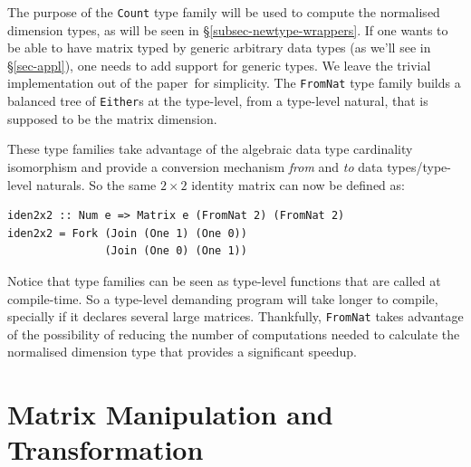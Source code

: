 \documentclass[sigplan,screen]{acmart}
\newcommand{\hs}{\texttt}
\def\doc{paper}
\begin{document}
The purpose of the \hs{Count} type family will be used to compute the normalised dimension types, as will be seen in \S\ref{subsec-newtype-wrappers}. If one wants to be able to have matrix typed by generic arbitrary data types (as we'll see in \S\ref{sec-appl}), one needs to add support for generic types. We leave the trivial implementation out of the \doc\ for simplicity. The \hs{FromNat} type family builds a balanced tree of \hs{Either}s at the type-level, from a type-level natural, that is supposed to be the matrix dimension.

These type families take advantage of the algebraic data type cardinality isomorphism and provide a conversion mechanism \emph{from} and \emph{to} data types/type-level naturals. So the same $2 \times 2$ identity matrix can now be defined as:

\vspace{1mm}
\begin{verbatim}
iden2x2 :: Num e => Matrix e (FromNat 2) (FromNat 2)
iden2x2 = Fork (Join (One 1) (One 0)) 
               (Join (One 0) (One 1))
\end{verbatim}
\vspace{1mm}

Notice that type families can be seen as type-level functions that are called at compile-time. So a type-level demanding program will take longer to compile, specially if it declares several large matrices. Thankfully, \hs{FromNat} takes advantage of the possibility of reducing the number of computations needed to calculate the normalised dimension type that provides a significant speedup.

\section{Matrix Manipulation and Transformation} \label{sec:200303a}
\end{document}
